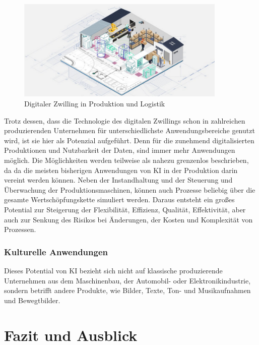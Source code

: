\documentclass[a4paper,12pt, german]{report}
\begin{document}
\begin{figure}[H]
  \center
 \includegraphics[width=10cm]{images/DZ.png}
  \caption[Digitaler Zwilling in Produktion und Logistik]{Digitaler Zwilling in Produktion und Logistik \cite{34}}
\end{figure}

Trotz dessen, dass die Technologie des digitalen Zwillings schon in zahlreichen produzierenden Unternehmen für unterschiedlichste Anwendungsbereiche genutzt wird, ist sie hier als Potenzial aufgeführt. Denn für die zunehmend digitalisierten Produktionen und Nutzbarkeit der Daten, sind immer mehr Anwendungen möglich. Die Möglichkeiten werden teilweise als nahezu grenzenlos beschrieben, da da die meisten bisherigen Anwendungen von KI in der Produktion darin vereint werden können. Neben der Instandhaltung und der Steuerung und Überwachung der Produktionsmaschinen, können auch Prozesse beliebig über die gesamte Wertschöpfungskette simuliert werden. Daraus entsteht ein großes Potential zur Steigerung der Flexibilität, Effizienz, Qualität, Effektivität, aber auch zur Senkung des Risikos bei Änderungen, der Kosten und Komplexität von Prozessen.\cite{33}

\subsection{Kulturelle Anwendungen}
Dieses Potential von KI bezieht sich nicht auf klassische produzierende Unternehmen aus dem Maschinenbau, der Automobil- oder Elektronikindustrie, sondern betrifft andere Produkte, wie Bilder, Texte, Ton- und Musikaufnahmen und Bewegtbilder. 


\chapter{Fazit und Ausblick}
\end{document}
